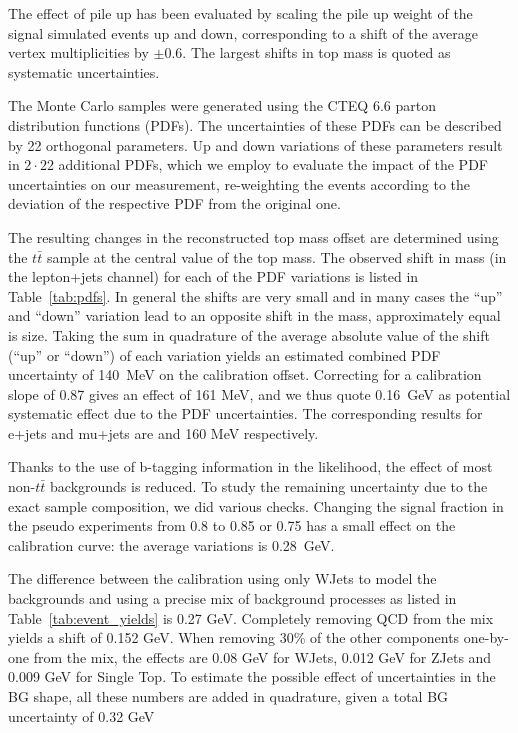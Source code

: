 \begin{description}[wide=\parindent]
The effect of pile up has been evaluated by scaling the pile up weight of the signal simulated events up and down,
corresponding to a shift of the average vertex multiplicities by $\pm$0.6. The largest shifts in top mass is quoted as
systematic uncertainties.

\item [PDF.]
The Monte Carlo samples were generated using the CTEQ 6.6 parton distribution functions (PDFs).
The uncertainties of these PDFs can be described by 22 orthogonal parameters.
Up and down variations of these parameters result in $2 \cdot 22$ additional PDFs, which we employ
to evaluate the impact of the PDF uncertainties on our measurement, re-weighting the events according
to the deviation of the respective PDF from the original one.

The resulting changes in the reconstructed top mass offset are determined using the  $t \bar t$ sample at the central
value of the top mass. The observed shift in mass (in the lepton+jets channel) for each of the PDF variations is
listed in Table~\ref{tab:pdfs}. In general the shifts are very small and in many cases the ``up'' and ``down''
variation lead to an opposite shift in the mass, approximately equal is size. Taking the sum in quadrature of the
average absolute value of the shift (``up'' or ``down'') of each variation yields an estimated combined PDF
uncertainty of 140~MeV on the calibration offset. Correcting for a calibration slope of 0.87 gives an effect of 161
MeV, and we thus quote 0.16~GeV as potential systematic effect due to the PDF uncertainties. The corresponding results
for e+jets and mu+jets are and 160 MeV respectively.


\item [Background modelling.]
Thanks to the use of b-tagging information in the likelihood, the effect of most non-$t \bar t$ backgrounds is reduced.
To study the remaining uncertainty due to the exact sample composition, we did various checks. Changing the signal
fraction in the pseudo experiments from 0.8 to 0.85 or 0.75 has a small effect on the calibration curve: the average
variations is 0.28~GeV.

The difference between the calibration using only WJets to model the backgrounds and using a precise mix of background
processes as listed in Table~\ref{tab:event_yields} is 0.27 GeV. Completely removing QCD from the mix yields a shift of
0.152 GeV. When removing 30\% of the other components one-by-one from the mix, the effects are 0.08 GeV for WJets, 0.012
GeV for ZJets and 0.009 GeV for Single Top. To estimate the possible effect of uncertainties in the BG shape, all these
numbers are added in quadrature, given a total BG uncertainty of 0.32 GeV


\end{description}
